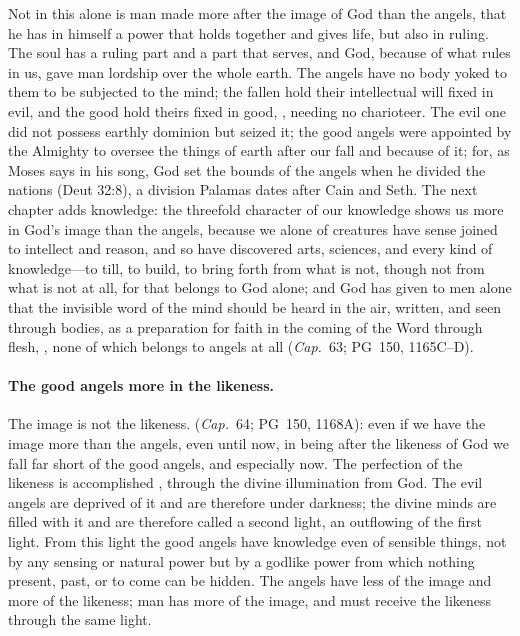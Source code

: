 \noindent Not in this alone is man made more after the image of God than the
angels, that he has in himself a power that holds together and gives life,
but also in ruling. The soul has a ruling part and a part that serves, and
God, because of what rules in us, gave man lordship over the whole earth.
The angels have no body yoked to them to be subjected to the mind; the
fallen hold their intellectual will fixed in evil, and the good hold theirs
fixed in good, , needing no
charioteer. The evil one did not possess earthly dominion but seized it; the
good angels were appointed by the Almighty to oversee the things of earth
after our fall and because of it; for, as Moses says in his song, God set
the bounds of the angels when he divided the nations (Deut 32:8), a
division Palamas dates after Cain and Seth. The next chapter adds
knowledge: the threefold character of our knowledge shows us more in God's
image than the angels, because we alone of creatures have sense joined to
intellect and reason, and so have discovered arts, sciences, and every kind
of knowledge---to till, to build, to bring forth from what is not, though
not from what is not at all, for that belongs to God alone; and God has
given to men alone that the invisible word of the mind should be heard in
the air, written, and seen through bodies, as a preparation for faith in the
coming of the Word through flesh, , none of which belongs to angels at all (\emph{Cap.}\ 63; PG~150,
1165C--D).

\paragraph{The good angels more in the likeness.} The image is not the
likeness.  (\emph{Cap.}\ 64;
PG~150, 1168A): even if we have the image more than the angels, even until
now, in being after the likeness of God we fall far short of the good angels,
and especially now. The perfection of the likeness is accomplished , through the divine illumination from
God. The evil angels are deprived of it and are therefore under darkness;
the divine minds are filled with it and are therefore called a second light,
an outflowing of the first light. From this light the good angels have
knowledge even of sensible things, not by any sensing or natural power but
by a godlike power from which nothing present, past, or to come can be
hidden. The angels have less of the image and more of the likeness; man
has more of the image, and must receive the likeness through the same light.

